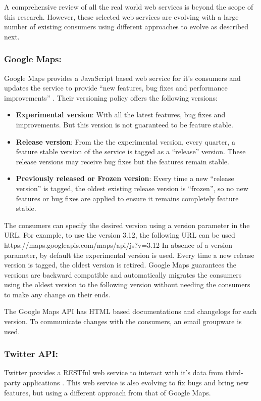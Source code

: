 \documentclass[runningheads,a4paper]{llncs}
\begin{document}
A comprehensive review of all the real world web services is beyond the scope of this research. However, these selected web services are evolving with a large number of existing consumers using different approaches to evolve as described next.

\subsubsection{Google Maps:}
Google Maps provides a JavaScript based web service for it’s consumers and updates the service to provide ``new features, bug fixes and performance improvements'' \cite{google_maps_versioning}. Their versioning policy offers the following versions:

\begin{itemize}
  \item \textbf{Experimental version}: With all the latest features, bug fixes and improvements. But this version is not guaranteed to be feature stable.
  \item \textbf{Release version}: From the the experimental version, every quarter, a feature stable version of the service is tagged as a ``release'' version. These release versions may receive bug fixes but the features remain stable.
  \item \textbf{Previously released or Frozen version}: Every time a new ``release version'' is tagged, the oldest existing release version is ``frozen'', so no new features or bug fixes are applied to ensure it remains completely feature stable.
\end{itemize}

The consumers can specify the desired version using a version parameter in the URL. For example, to use the version 3.12, the following URL can be used https://maps.googleapis.com/maps/api/js?v=3.12 In absence of a version parameter, by default the experimental version is used.
Every time a new release version is tagged, the oldest version is retired. Google Maps guarantees the versions are backward compatible and automatically migrates the consumers using the oldest version to the following version without needing the consumers to make any change on their ends.

The Google Maps API has HTML based documentations and changelogs for each version. To communicate changes with the consumers, an email groupware is used.


\subsubsection{Twitter API:}
Twitter provides a RESTful web service to interact with it’s data from third-party applications \cite{twitter_api}. This web service is also evolving to fix bugs and bring new features, but using a different approach from that of Google Maps.
\end{document}
